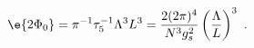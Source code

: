 \begin{equation}
\label{Phi0_interpret}
  \e{2\Phi_0} = \pi^{-1} \tau_5^{-1} \Lambda^3 L^3 = 
  \frac{2(2\pi)^4}{N^3 g_s^2} \left(\frac{\Lambda}{L}\right)^3~.
\end{equation}

